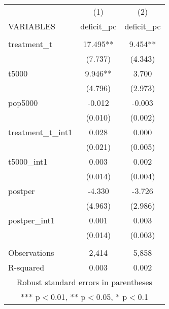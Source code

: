 \documentclass[]{article}
\begin{document}
\begin{tabular}{lcc} \hline
 & (1) & (2) \\
VARIABLES & deficit\_pc & deficit\_pc \\ \hline
 &  &  \\
treatment\_t & 17.495** & 9.454** \\
 & (7.737) & (4.343) \\
t5000 & 9.946** & 3.700 \\
 & (4.796) & (2.973) \\
pop5000 & -0.012 & -0.003 \\
 & (0.010) & (0.002) \\
treatment\_t\_int1 & 0.028 & 0.000 \\
 & (0.021) & (0.005) \\
t5000\_int1 & 0.003 & 0.002 \\
 & (0.014) & (0.004) \\
postper & -4.330 & -3.726 \\
 & (4.963) & (2.986) \\
postper\_int1 & 0.001 & 0.003 \\
 & (0.014) & (0.003) \\
 &  &  \\
Observations & 2,414 & 5,858 \\
 R-squared & 0.003 & 0.002 \\ \hline
\multicolumn{3}{c}{ Robust standard errors in parentheses} \\
\multicolumn{3}{c}{ *** p$<$0.01, ** p$<$0.05, * p$<$0.1} \\
\end{tabular}
\end{document}
